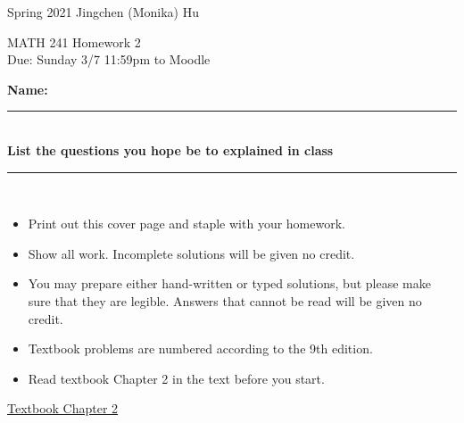 \documentclass[11pt]{article}
\begin{document}
\enlargethispage{\baselineskip}

Spring 2021 \hfill Jingchen (Monika) Hu\\

\begin{center}
{\huge MATH 241 Homework 2}	\\
Due: Sunday 3/7 11:59pm to Moodle
\end{center}
\vspace{0.5cm}

\textbf{Name:} \rule{6cm}{0.5pt}\\
\textbf{List the questions you hope be to explained in class} \rule{3cm}{0.5pt}	 \\


{\bf
\begin{itemize}
\item Print out this cover page and staple with your homework.
\item Show all work. Incomplete solutions will be given no credit.
\item You may prepare either hand-written or typed solutions, but please make sure that they are legible.
Answers that cannot be read will be given no credit.
\item Textbook problems are numbered according to the 9th edition.
\item Read textbook Chapter 2 in the text before you start.

\end{itemize}
}

%
%
%
%



\underline{Textbook  Chapter 2   }
\end{document}
